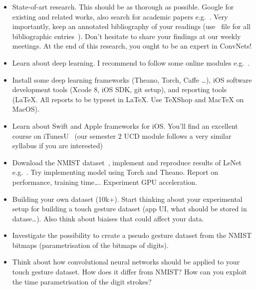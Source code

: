 \documentclass[]{weekly-report}
\begin{document}
\begin{itemize}

\item State-of-art research. This should be as thorough as possible. Google for existing and related works, also search for academic papers e.g.~\cite{IEEEwebsite, ACMwebsite,Lecun-pubs}. Very importantly, keep an annotated bibliography of your readings (use \BibTeX\ file for all bibliographic entries~\cite{BibTeX}). Don't hesitate to share your findings at our weekly meetings. At the end of this research, you ought to be an expert in ConvNets!

\item Learn about deep learning. I recommend to follow some online modules e.g.~\cite{Ng-Coursera-2016, VincentVanhoucke-Udacity-2016, Nvidia-DL-Course-2016}.

\item Install some deep learning frameworks (Theano, Torch, Caffe \ldots), iOS software development tools  (Xcode 8, iOS SDK, git setup), and reporting tools (LaTeX. All reports to be typeset in \LaTeX. Use TeXShop and MacTeX on MacOS).

\item Learn about Swift and Apple frameworks for iOS. You'll find an excellent course on iTunesU~\cite{PaulHegarty2016} (our semester 2 UCD module follows a very similar syllabus if you are interested)


\item Download the NMIST dataset~\cite{NMIST-dataset}, implement and reproduce results of LeNet e.g.~\cite{YannLecun-98}. Try implementing model using Torch and Theano. Report on performance, training time\ldots. Experiment GPU acceleration.

\item Building your own dataset (10k+). Start thinking about your experimental setup for building a touch gesture dataset (app UI, what should be stored in datase\ldots). Also think about  biaises that could affect your data.

\item Investigate the possibility to create a pseudo gesture dataset from the NMIST bitmaps (parametrisation of the bitmaps of digits).

\item Think about how convolutional neural networks should be applied to your touch gesture dataset. How does it differ from NMIST? How can you exploit the time parametrisation of the digit strokes?

\end{itemize}
\end{document}

